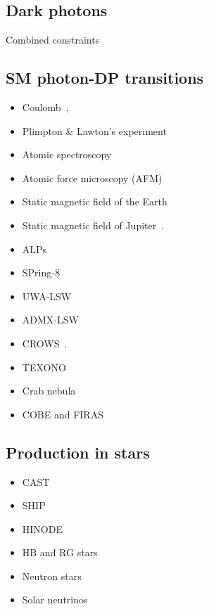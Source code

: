 \documentclass[10pt,twocolumn]{extarticle}
\begin{document}
\begin{mdframed}
\section{Dark photons}\vspace{-0.5em}
Combined constraints~\cite{Caputo:2021eaa}
\subsection*{SM photon-DP transitions}\vspace{-0.5em}
\begin{itemize}\setlength\itemsep{-0.5em}
\item Coulomb~\cite{Goldhaber:2008xy,Williams:1971ms,Bartlett:1988yy,Tu:2005ge,Kroff:2020zhp},
\item Plimpton \& Lawton's experiment~\cite{Plimpton:1936ont,Kroff:2020zhp}
\item Atomic spectroscopy~\cite{Jaeckel:2010xx}
\item Atomic force microscopy (AFM)~\cite{Kroff:2020zhp}
\item Static magnetic field of the Earth~\cite{Goldhaber:1971mr,Fischbach:1994ir,Marocco:2021dku}
\item Static magnetic field of Jupiter~\cite{Davis:1975mn,Marocco:2021dku}. 
\item ALPs~\cite{Ehret:2010mh}
\item SPring-8~\cite{Inada:2013tx}
\item UWA-LSW~\cite{Povey:2010hs,Parker:2013fxa}
\item ADMX-LSW~\cite{Wagner:2010mi}
\item CROWS~\cite{Betz:2013dza}.
\item TEXONO~\cite{Danilov:2018bks}
\item Crab nebula~\cite{Zechlin:2008tj}
\item COBE and FIRAS~\cite{Caputo:2020bdy}
\end{itemize}

\subsection*{Production in stars}\vspace{-0.5em}
\begin{itemize}\setlength\itemsep{-0.5em}
\item CAST~\cite{Redondo:2008aa}
\item SHIP~\cite{Schwarz:2015lqa} 
\item HINODE~\cite{Frerick:2022mjg}
\item HB and RG stars~\cite{Redondo:2013lna}
\item Neutron stars~\cite{Hong:2020bxo}
\item Solar neutrinos~\cite{Vinyoles:2015aba}
\end{itemize}


\end{mdframed}
\end{document}
